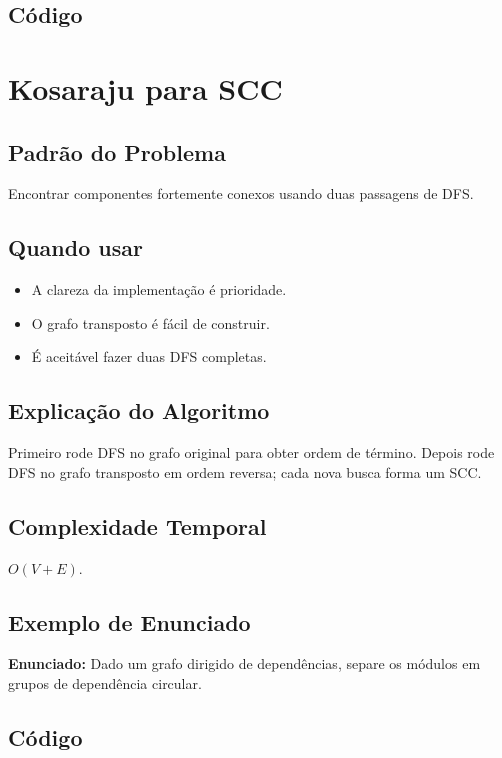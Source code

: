 \subsection{Código}

\section{Kosaraju para SCC}

\subsection{Padrão do Problema}
Encontrar componentes fortemente conexos usando duas passagens de DFS.

\subsection{Quando usar}
\begin{itemize}[nosep]
  \item A clareza da implementação é prioridade.
  \item O grafo transposto é fácil de construir.
  \item É aceitável fazer duas DFS completas.
\end{itemize}

\subsection{Explicação do Algoritmo}
Primeiro rode DFS no grafo original para obter ordem de término. Depois rode DFS no grafo transposto em ordem reversa; cada nova busca forma um SCC.

\subsection{Complexidade Temporal}
$O(V + E)$.

\subsection{Exemplo de Enunciado}
\begin{exemplodiabox}
\textbf{Enunciado:} Dado um grafo dirigido de dependências, separe os módulos em grupos de dependência circular.
\end{exemplodiabox}

\subsection{Código}

